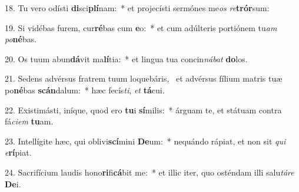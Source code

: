18. Tu vero odísti \textbf{di}sci\textbf{plí}nam:~*  et projecísti sermónes me\textit{os} \textit{re}\textbf{trór}sum:\

19. Si vidébas furem, cur\textbf{ré}bas cum \textbf{e}o:~*  et cum adúlteris portiónem tu\textit{am} \textit{po}\textbf{né}bas.\

20. Os tuum abun\textbf{dá}vit ma\textbf{lí}tia:~*  et lingua tua concin\textit{ná}\textit{bat} \textbf{do}los.\

21. Sedens advérsus fratrem tuum loquebáris, \dag\  et advérsus fílium matris tuæ po\textbf{né}bas \textbf{scán}dalum:~*  hæc fecís\textit{ti}, \textit{et} \textbf{tá}cui.\

22. Existimásti, iníque, quod ero \textbf{tu}i \textbf{sí}milis:~*  árguam te, et státuam contra fá\textit{ci}\textit{em} \textbf{tu}am.\

23. Intellígite hæc, qui oblivi\textbf{scí}mini \textbf{De}um:~*  nequándo rápiat, et non sit \textit{qui} \textit{e}\textbf{rí}piat.\

24. Sacrifícium laudis hono\textbf{ri}fi\textbf{cá}bit me:~*  et illic iter, quo osténdam illi salu\textit{tá}\textit{re} \textbf{De}i.\

